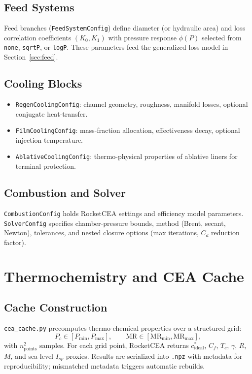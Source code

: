 \documentclass[12pt]{article}
\begin{document}
\subsection{Feed Systems}
Feed branches (\verb|FeedSystemConfig|) define diameter (or hydraulic area) and loss correlation coefficients $(K_0, K_1)$ with pressure response $\phi(P)$ selected from \texttt{none}, \texttt{sqrtP}, or \texttt{logP}.  These parameters feed the generalized loss model in Section~\ref{sec:feed}.

\subsection{Cooling Blocks}
\begin{itemize}
    \item \verb|RegenCoolingConfig|: channel geometry, roughness, manifold losses, optional conjugate heat-transfer.
    \item \verb|FilmCoolingConfig|: mass-fraction allocation, effectiveness decay, optional injection temperature.
    \item \verb|AblativeCoolingConfig|: thermo-physical properties of ablative liners for terminal protection.
\end{itemize}

\subsection{Combustion and Solver}
\verb|CombustionConfig| holds RocketCEA settings and efficiency model parameters.  \verb|SolverConfig| specifies chamber-pressure bounds, method (Brent, secant, Newton), tolerances, and nested closure options (max iterations, $C_d$ reduction factor).

\section{Thermochemistry and CEA Cache}

\subsection{Cache Construction}
\verb|cea_cache.py| precomputes thermo-chemical properties over a structured grid:
\[
P_c \in [P_{\min}, P_{\max}], \qquad \text{MR} \in [\text{MR}_{\min}, \text{MR}_{\max}],
\]
with $n_{\text{points}}^2$ samples.  For each grid point, RocketCEA returns $c^*_{\text{ideal}}$, $C_f$, $T_c$, $\gamma$, $R$, $M$, and sea-level $I_{sp}$ proxies.  Results are serialized into \verb|.npz| with metadata for reproducibility; mismatched metadata triggers automatic rebuilds.
\end{document}
